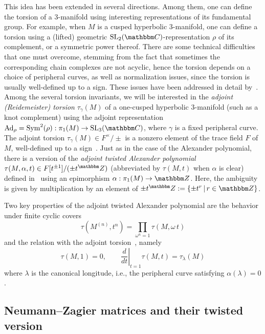 \documentclass[12pt,reqno]{amsart}
\theoremstyle{definition}
\def\BZ{\mathbbm Z}
\def\BC{\mathbbm C}
\def\SL{\mathrm{SL}}
\def\be{\begin{equation}}
\def\ee{\end{equation}}
\begin{document}
This idea has been extended in several directions.
Among them, one can define the torsion of a 3-manifold using interesting
representations of its fundamental group. For example, when $M$
is a cusped hyperbolic 3-manifold, one can define a torsion using a (lifted) geometric
$\SL_2(\BC)$-representation $\rho$ of its complement, or a symmetric power thereof.
There are some technical difficulties that one must overcome, stemming from the fact
that sometimes the corresponding chain complexes are not acyclic, hence the
torsion depends on a choice of peripheral curves, as well as normalization issues, since
the torsion is usually well-defined up to a sign. These issues have been addressed
in detail by~\cite{Porti:torsion,DubYam,Dunfield:twisted}. Among the several torsion
invariants,
we will be interested in the \emph{adjoint (Reidemeister) torsion} $\tau_\gamma(M)$
of a one-cusped hyperbolic 3-manifold (such as a knot complement) using the adjoint
representation $\mathrm{Ad}_\rho=\text{Sym}^2(\rho): \pi_1(M) \to \SL_3(\BC)$, where
$\gamma$ is a fixed peripheral curve. The adjoint torsion $\tau_\gamma(M) \in F^\times/\pm$
is a nonzero element of the trace field $F$ of $M$, well-defined up
to a sign~\cite{Porti:torsion}. Just as in the case of the Alexander polynomial,
there is a version of the \emph{adjoint twisted Alexander polynomial}
$\tau(M,\alpha,t) \in F[t^{\pm1}]/(\pm t^\BZ)$ (abbreviated by $\tau(M,t)$ when
$\alpha$ is clear) defined in~\cite{Wad94,Dunfield:twisted,DubYam} using an epimorphism
$\alpha: \pi_1(M) \to \BZ$. Here, the ambiguity is given by multiplication by an
element of $\pm t^\BZ:=\{\pm t^r \, | \, r \in \BZ\}$.

Two key properties of the adjoint twisted Alexander polynomial are
the behavior under finite cyclic covers~\cite{DubYam}
\be
\label{key1}
\tau(M^{(n)},t^n)=\prod_{\omega^n=1}\tau(M,\omega\, t)
\ee
and the relation with the adjoint torsion~\cite{Yamaguchi}, namely
\be
\label{key2}
\tau(M,1)=0, \qquad \left. \frac{d}{dt}\right|_{t=1}
\tau(M,t) = \tau_\lambda(M)
\ee
where $\lambda$ is the canonical longitude, i.e., the peripheral curve satisfying
$\alpha(\lambda)=0$. 

\subsection{Neumann--Zagier matrices and their twisted version}
\label{sub.tNZ}
\end{document}
